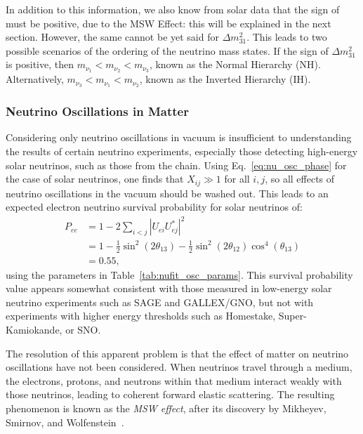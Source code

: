 In addition to this information, we also know from solar data that the sign of \dmsq{} must be positive, due to the MSW Effect: this will be explained in the next section. However, the same cannot be yet said for $\Delta m^{2}_{31}$. This leads to two possible scenarios of the ordering of the neutrino mass states. If the sign of $\Delta m^{2}_{31}$ is positive, then $m_{\nu_{1}}<m_{\nu_{2}}<m_{\nu_{3}}$, known as the Normal Hierarchy (NH). Alternatively, $m_{\nu_{3}}<m_{\nu_{1}}<m_{\nu_{2}}$, known as the Inverted Hierarchy (IH).

\subsubsection{Neutrino Oscillations in Matter}
Considering only neutrino oscillations in vacuum is insufficient to understanding the results of certain neutrino experiments, especially those detecting high-energy solar neutrinos, such as those from the \beight{} chain. Using Eq.~\ref{eq:nu_osc_phase} for the case of solar neutrinos, one finds that $X_{ij}\gg 1$ for all $i,j$, so all effects of neutrino oscillations in the vacuum should be washed out. This leads to an expected electron neutrino survival probability for solar neutrinos of:
\begin{align}\label{eq:solar_pee_naive}
    P_{ee}  &= 1 - 2\sum_{i<j}|U_{ei}U_{ej}^{*}|^{2}\\
            &= 1 - \frac{1}{2}\sin^{2}(2\theta_{13}) - \frac{1}{2}\sin^{2}(2\theta_{12})\cos^{4}(\theta_{13})\\
            &= 0.55,
\end{align}
using the parameters in Table~\ref{tab:nufit_osc_params}. This survival probability value appears somewhat consistent with those measured in low-energy solar neutrino experiments such as SAGE and GALLEX/GNO, but not with experiments with higher energy thresholds such as Homestake, Super-Kamiokande, or SNO.

The resolution of this apparent problem is that the effect of matter on neutrino oscillations have not been considered. When neutrinos travel through a medium, the electrons, protons, and neutrons within that medium interact weakly with those neutrinos, leading to coherent forward elastic scattering. The resulting phenomenon is known as the \textit{MSW effect}, after its discovery by Mikheyev, Smirnov, and Wolfenstein~\cite{wolfensteinNeutrinoOscillationsMatter1978,mikheyevResonantAmplificationOscillations1986}. %

